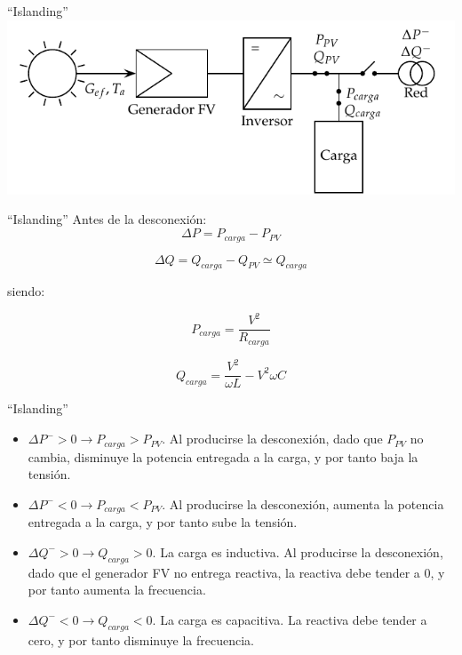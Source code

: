 \documentclass[xcolor={usenames,svgnames,dvipsnames}]{beamer}
\begin{document}
\begin{frame}[label=sec-2-0-19]{``Islanding''}
\includegraphics[width=.9\linewidth]{../figs/Isla.pdf}
\end{frame}

\begin{frame}[label=sec-2-0-20]{``Islanding''}
Antes de la desconexión:$$\Delta P=P_{carga}-P_{PV}$$

$$\Delta Q=Q_{carga}-Q_{PV}\simeq Q_{carga}$$

siendo:

$$P_{carga}=\frac{V^{2}}{R_{carga}}$$

$$Q_{carga}=\frac{V^{2}}{\omega L}-V^{2}\omega C$$
\end{frame}

\begin{frame}[label=sec-2-0-21]{``Islanding''}
\begin{itemize}
\item $\Delta P^{-}>0\rightarrow P_{carga}>P_{PV}$. Al producirse la
desconexión, dado que $P_{PV}$ no cambia, disminuye la potencia
entregada a la carga, y por tanto baja la tensión.

\item $\Delta P^{-}<0\rightarrow P_{carga}<P_{PV}$. Al producirse la
desconexión, aumenta la potencia entregada a la carga, y por tanto
sube la tensión.

\item $\Delta Q^{-}>0\rightarrow Q_{carga}>0$. La carga es inductiva. Al
producirse la desconexión, dado que el generador FV no entrega
reactiva, la reactiva debe tender a 0, y por tanto aumenta la
frecuencia.

\item $\Delta Q^{-}<0\rightarrow Q_{carga}<0$. La carga es capacitiva. La
reactiva debe tender a cero, y por tanto disminuye la frecuencia.
\end{itemize}
\end{frame}
\end{document}
